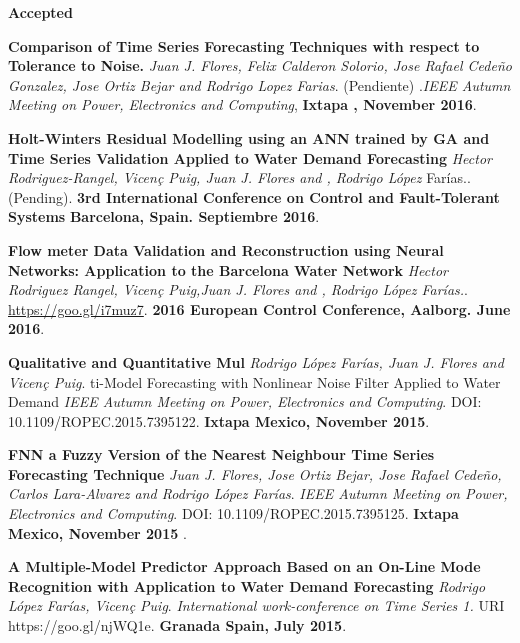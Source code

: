 \documentclass[10pt]{article}
\newenvironment{innerlist}[1][\enskip\textbullet]%
        {\begin{compactitem}[#1]}{\end{compactitem}}
\newcommand{\blankline}{\quad\pagebreak[2]}
\begin{document}
\blankline
\textbf{Accepted}
\begin{innerlist}


\item \textbf{Comparison of Time Series Forecasting Techniques with respect to Tolerance to Noise.} \textit{Juan J. Flores, Felix Calderon Solorio, Jose Rafael Cede\~no Gonzalez, Jose Ortiz Bejar and Rodrigo Lopez Farias}. (Pendiente) .\textit{IEEE Autumn Meeting on Power, Electronics and Computing}, \textbf{Ixtapa , November 2016}.


\item \textbf{Holt-Winters Residual Modelling using an ANN trained by GA and Time Series Validation Applied to Water Demand Forecasting} \textit{Hector Rodriguez-Rangel, Vicen\c{c} Puig, Juan J. Flores and ,  Rodrigo López} Farías.. (Pending). \textbf{3rd International Conference on Control and Fault-Tolerant Systems} \textbf{Barcelona, Spain. Septiembre 2016}.

\item \textbf{Flow meter Data Validation and Reconstruction using Neural Networks: Application to the Barcelona Water Network} \textit{Hector Rodriguez Rangel, Vicen\c{c} Puig,Juan J. Flores and ,  Rodrigo López Farías.}. \url{https://goo.gl/i7muz7}. \textbf{2016 European Control Conference, Aalborg. June 2016}.

\item \textbf{Qualitative and Quantitative Mul} \textit{Rodrigo López Farías, Juan J. Flores and Vicen\c{c} Puig}.  ti-Model Forecasting with Nonlinear Noise Filter Applied to Water Demand \textit{IEEE Autumn Meeting on Power, Electronics and Computing}. DOI: 10.1109/ROPEC.2015.7395122.  \textbf{Ixtapa Mexico, November 2015}.

\item \textbf{FNN a Fuzzy Version of the Nearest Neighbour Time Series Forecasting Technique } \textit{Juan J. Flores, Jose Ortiz Bejar, Jose Rafael Cedeño, Carlos Lara-Alvarez and Rodrigo López Farías}. \textit{IEEE Autumn Meeting on Power, Electronics and Computing}. DOI: 10.1109/ROPEC.2015.7395125. \textbf{Ixtapa Mexico, November 2015 }.

\item \textbf{A Multiple-Model Predictor Approach Based on an On-Line Mode Recognition with Application to Water Demand Forecasting} \textit{Rodrigo López Farías, Vicen\c{c} Puig}.  \textit{International work-conference on Time Series 1. 
} URI https://goo.gl/njWQ1e. \textbf{Granada Spain, July 2015}.


\end{innerlist}
\end{document}
